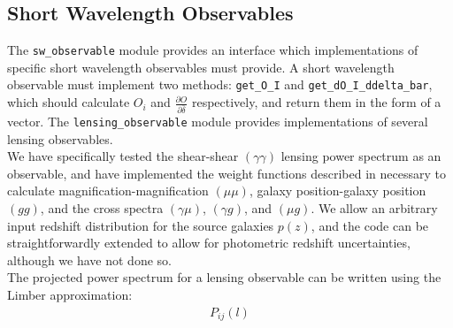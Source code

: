 \documentclass[a4paper,11pt]{article}
\begin{document}
\subsection{Short Wavelength Observables}
\label{ssec:sw_observables}
The \texttt{sw\_observable} module provides an interface which implementations of specific short wavelength observables must provide. A short wavelength observable must implement two methods: \texttt{get\_O\_I}  and \texttt{get\_dO\_I\_ddelta\_bar}, which should calculate $O_i$ and $\frac{\partial O}{\partial \bar{\delta}}$ respectively, and return them in the form of a vector. The \texttt{lensing\_observable} module provides implementations of several lensing observables. 
\\
We have specifically tested the shear-shear $(\gamma\gamma)$ lensing power spectrum as an observable, and have implemented the weight functions described in \cite{eifler_krause_cosmolike} necessary to calculate magnification-magnification $(\mu\mu)$, galaxy position-galaxy position $(gg)$, and the cross spectra $(\gamma\mu)$, $(\gamma g)$, and $(\mu g)$. We allow an arbitrary input redshift distribution for the source galaxies $p(z)$, and the code can be straightforwardly extended to allow for photometric redshift uncertainties, although we have not done so. 
\\
The projected power spectrum for a lensing observable can be written using the Limber approximation:
\begin{align}\label{limber_power}
P_{ij}(l)
\end{align}
\end{document}
